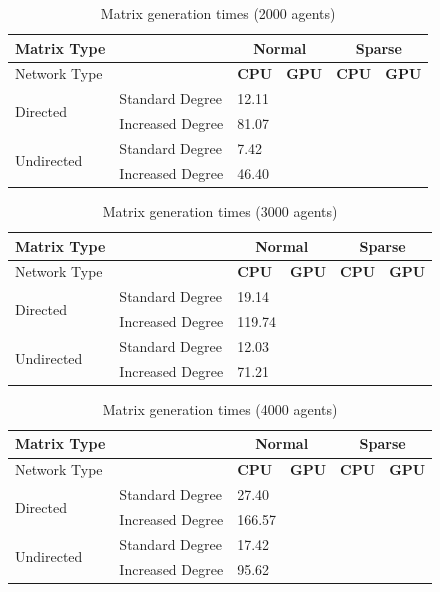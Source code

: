 \documentclass{article}
\begin{document}
\begin{table}[H]
    \centering
    \begin{tabular}{llllll}
        \toprule
        Matrix Type &  & \multicolumn{2}{c}{Normal} & \multicolumn{2}{c}{Sparse}\\
        \midrule 
        Network Type &  &\textbf{CPU} & \textbf{GPU} & \textbf{CPU} & \textbf{GPU} \\
        \midrule
        \multirow{2}{*}{Directed} & Standard Degree & 12.11 & & & \\
                                  & Increased Degree & 81.07 & & & \\
        \multirow{2}{*}{Undirected} & Standard Degree & 7.42 & & & \\
                                  & Increased Degree & 46.40 & & & \\
        \bottomrule
    \end{tabular}
    \label{table:gen_2000}
    \caption{Matrix generation times (2000 agents)}
\end{table}

\begin{table}[H]
    \centering
    \begin{tabular}{llllll}
        \toprule
        Matrix Type &  & \multicolumn{2}{c}{Normal} & \multicolumn{2}{c}{Sparse}\\
        \midrule 
        Network Type &  &\textbf{CPU} & \textbf{GPU} & \textbf{CPU} & \textbf{GPU} \\
        \midrule
        \multirow{2}{*}{Directed} & Standard Degree & 19.14 & & & \\
                                  & Increased Degree & 119.74 & & & \\
        \multirow{2}{*}{Undirected} & Standard Degree & 12.03 & & & \\
                                  & Increased Degree & 71.21 & & & \\
        \bottomrule
    \end{tabular}
    \label{table:gen_3000}
    \caption{Matrix generation times (3000 agents)}
\end{table}

\begin{table}[H]
    \centering
    \begin{tabular}{llllll}
        \toprule
        Matrix Type &  & \multicolumn{2}{c}{Normal} & \multicolumn{2}{c}{Sparse}\\
        \midrule 
        Network Type &  &\textbf{CPU} & \textbf{GPU} & \textbf{CPU} & \textbf{GPU} \\
        \midrule
        \multirow{2}{*}{Directed} & Standard Degree & 27.40 & & & \\
                                  & Increased Degree & 166.57 & & & \\
        \multirow{2}{*}{Undirected} & Standard Degree & 17.42 & & & \\
                                  & Increased Degree & 95.62 & & & \\
        \bottomrule
    \end{tabular}
    \label{table:gen_4000}
    \caption{Matrix generation times (4000 agents)}
\end{table}
\end{document}
